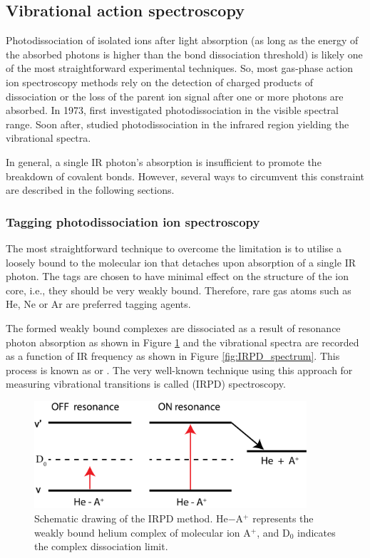 \subsection{Vibrational action spectroscopy}
\label{subsec:action:methods:vibrational}

Photodissociation of isolated ions after light absorption (as long as the energy of the absorbed photons is higher than the bond dissociation threshold) is likely one of the most straightforward experimental techniques. So, most gas-phase action ion spectroscopy methods rely on the detection of charged products of dissociation or the loss of the parent ion signal after one or more photons are absorbed. In 1973, \citet{dunbar_photodissociation_1973} first investigated photodissociation in the visible spectral range. Soon after, \citet{okumura_vibrational_1985} studied photodissociation in the infrared region yielding the vibrational spectra.

In general, a single IR photon's absorption is insufficient to promote the breakdown of covalent bonds. However, several ways to circumvent this constraint are described in the following sections.

\subsubsection{Tagging photodissociation ion spectroscopy}
\label{subsec:action:methods:vibrational:IRPD}
The most straightforward technique to overcome the limitation is to utilise a loosely bound  to the molecular ion that detaches upon absorption of a single IR photon. The tags are chosen to have minimal effect on the structure of the ion core, i.e., they should be very weakly bound. Therefore, rare gas atoms such as He, Ne or Ar are preferred tagging agents.

The formed weakly bound complexes are dissociated as a result of resonance photon absorption as shown in Figure \ref{fig:IRPD} and the vibrational spectra are recorded as a function of IR frequency as shown in Figure \ref{fig:IRPD_spectrum}. This process is known as  or . The very well-known technique using this approach for measuring vibrational transitions is called  (IRPD) spectroscopy.

\begin{figure}[!htb]
    \centering
    \includegraphics[width=0.9\textwidth]{figures/intro/IRPD.png}
    \caption{Schematic drawing of the IRPD method. He$-$A$^+$ represents the weakly bound helium complex of molecular ion A$^+$, and D$_0$ indicates the complex dissociation limit.}
    \label{fig:IRPD}
\end{figure}


